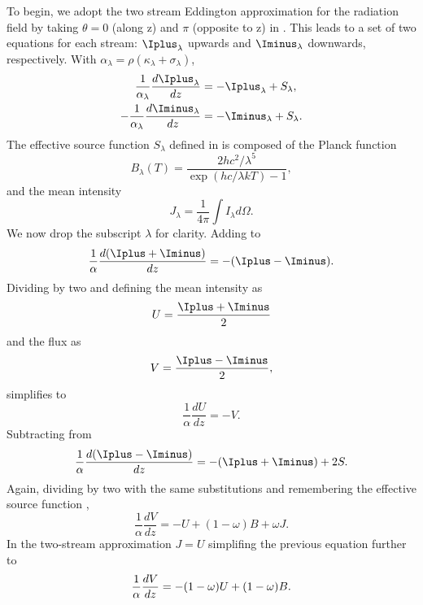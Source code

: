 To begin, we adopt the two stream Eddington approximation for the radiation field by taking $\theta = 0$ (along z) and $\pi$ (opposite to z) in .
This leads to a set of two equations for each stream: $\Iplus_\lambda$ upwards and $\Iminus_\lambda$ downwards, respectively.
With $\alpha_\lambda = \rho(\kappa_\lambda + \sigma_\lambda)$,
\begin{align} 
    \frac{1}{\alpha_\lambda}\frac{d\Iplus_\lambda}{dz} &= -\Iplus_\lambda + S_\lambda \label{eqn:dIpdz}, \\
    -\frac{1}{\alpha_\lambda}\frac{d\Iminus_\lambda}{dz} &= -\Iminus_\lambda + S_\lambda. \label{eqn:dImdz}
\end{align}
The effective source function $S_\lambda$ defined in  is composed of the Planck function
\begin{equation}
    B_{\lambda}(T) = \frac{2hc^2/\lambda^5}{\exp(hc/\lambda k T) - 1},
\end{equation}
and the mean intensity
\begin{equation}
    J_\lambda = \frac{1}{4\pi}\int I_\lambda d\Omega.
\end{equation}
We now drop the subscript $\lambda$ for clarity.
Adding  to 
\begin{equation}\label{eqn:dIdz}
    \frac{1}{\alpha}\frac{d(\Iplus + \Iminus)}{dz} = - (\Iplus - \Iminus).
\end{equation}
Dividing by two and defining the mean intensity as 
\begin{equation}
    U = \frac{\Iplus + \Iminus}{2}
\end{equation}
and the flux as
\begin{equation}
    V = \frac{\Iplus - \Iminus}{2},
\end{equation}
 simplifies to
\begin{equation}\label{eqn:dUdz=-V}
    \frac{1}{\alpha}\frac{dU}{dz} = -V.
\end{equation}
Subtracting  from 
\begin{equation}
    \frac{1}{\alpha}\frac{d(\Iplus - \Iminus)}{dz} = - (\Iplus + \Iminus) + 2S.
\end{equation}
Again, dividing by two with the same substitutions and remembering the effective source function ,
\begin{equation}
    \frac{1}{\alpha}\frac{dV}{dz} = -U + (1-\omega) B + \omega J.
\end{equation}
In the two-stream approximation $J=U$ simplifing the previous equation further to
\begin{equation}
    \frac{1}{\alpha}\frac{dV}{dz} = -(1-\omega) U + (1-\omega) B. \\
\end{equation}

